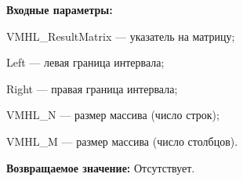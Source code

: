 \textbf{Входные параметры:}

 VMHL\_ResultMatrix --- указатель на матрицу;
 
 Left --- левая граница интервала;
 
 Right --- правая граница интервала;
 
 VMHL\_N --- размер массива (число строк);
 
 VMHL\_M --- размер массива (число столбцов).

\textbf{Возвращаемое значение:}
Отсутствует.